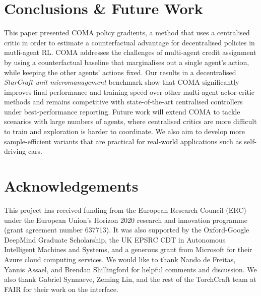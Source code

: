 \documentclass[letterpaper]{article}
\begin{document}

\section{Conclusions \& Future Work}
\label{sec:conclusion}

This paper presented COMA policy gradients, a method that uses a centralised 
critic in order to estimate a counterfactual advantage for decentralised 
policies in mutli-agent RL. COMA addresses the challenges of multi-agent credit 
assignment by using a counterfactual baseline that marginalises out a single 
agent's action, while keeping the other agents' actions fixed. Our results in a 
decentralised \emph{StarCraft unit micromanagement} benchmark show that COMA 
significantly improves final performance and training speed over other 
multi-agent actor-critic methods and remains competitive with state-of-the-art 
centralised controllers under best-performance reporting. Future work will 
extend COMA to tackle scenarios with large numbers of agents, where centralised 
critics are more difficult to train and exploration is harder to coordinate. We 
also aim to develop more  sample-efficient variants that are practical for 
real-world applications such as self-driving cars.

\section*{Acknowledgements} 
This project has received funding from the European Research Council (ERC) under the European Union's Horizon 2020 research and innovation programme (grant agreement number 637713).  It was also supported by the Oxford-Google DeepMind Graduate Scholarship, the 
UK EPSRC CDT in Autonomous Intelligent Machines and Systems, and a generous 
grant from Microsoft for their Azure cloud computing services.
We would like to thank Nando de Freitas, Yannis Assael, and Brendan Shillingford
for helpful comments and discussion. We also thank Gabriel Synnaeve, Zeming Lin,
and the rest of the TorchCraft team at FAIR for their work on the interface.
\end{document}
